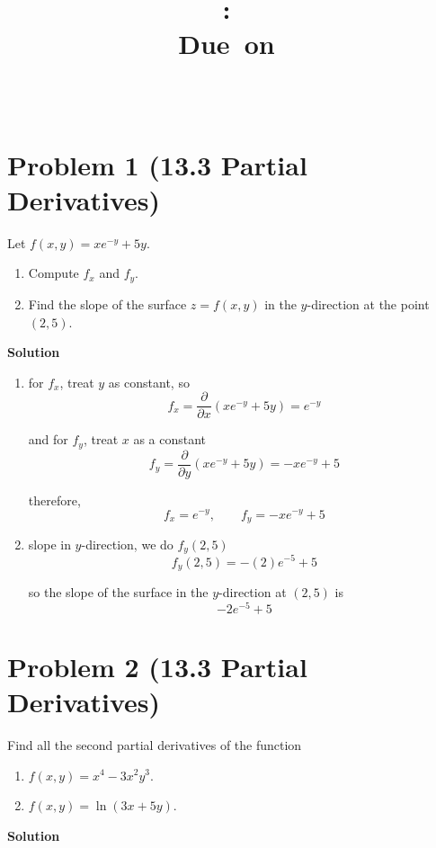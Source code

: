 \documentclass{article}
\title{
    \vspace{2in}
    \textmd{\textbf{\hmwkClass:\ \hmwkTitle}}\\
    \normalsize\vspace{0.1in}\small{Due\ on\ \hmwkDueDate}\\
    \vspace{0.1in}\large{\textit{\hmwkClassInstructor\ \hmwkClassTime}}
    \vspace{3in}
}
\author{\hmwkAuthorName}
\date{}
\newcommand{\solution}{\textbf{\large Solution}}
\theoremstyle{remark}
\begin{document}
\maketitle
\newpage

\section*{Problem 1 (13.3 Partial Derivatives)}
Let $f(x, y) = xe^{-y} + 5y$.
\begin{enumerate}[label=(\alph*)]
    \item Compute $f_x$ and $f_y$.
    \item Find the slope of the surface $z = f(x, y)$ in the $y$-direction at the point $(2, 5)$.
\end{enumerate}

\medskip
\solution

\begin{enumerate}[label=(\alph*)]
    \item for $f_x$, treat $y$ as constant, so
    \[
        f_x = \frac{\partial}{\partial x}(xe^{-y} + 5y) = e^{-y}
    \]

    and for $f_y$, treat $x$ as a constant
    \[
        f_y = \frac{\partial}{\partial y}(xe^{-y} + 5y) = -xe^{-y} + 5
    \]

    therefore,
    \[
        \boxed{f_x = e^{-y}, \qquad f_y = -xe^{-y} + 5}
    \]

    \item slope in $y$-direction, we do $f_y(2,5)$
    \[
        f_y(2,5) = -(2)e^{-5} + 5
    \]

    so the slope of the surface in the $y$-direction at $(2,5)$ is
    \[
        \boxed{-2e^{-5} + 5}
    \]
\end{enumerate}

\vspace{1em}
\hrulefill

\section*{Problem 2 (13.3 Partial Derivatives)}
Find all the second partial derivatives of the function
\begin{enumerate}[label=(\alph*)]
    \item $f(x, y) = x^4 - 3x^2y^3$.
    \item $f(x, y) = \ln(3x + 5y)$.
\end{enumerate}

\medskip
\solution
\end{document}
